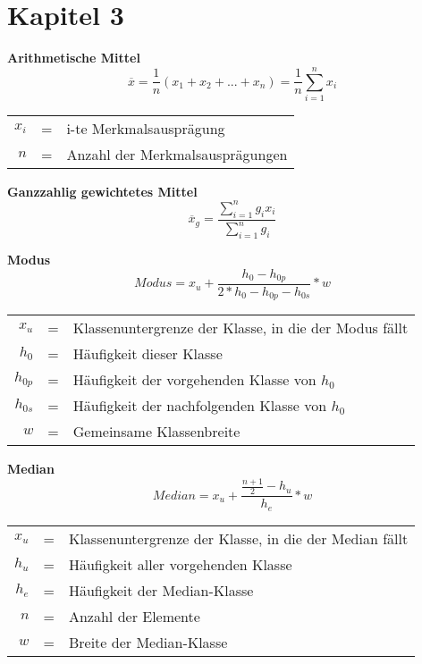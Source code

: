 \documentclass[11pt,twocolumn,fleqn]{article}
\begin{document}
\footnotesize

\section{Kapitel 3}

\textbf{Arithmetische Mittel}
\begin{equation*}
\overline{x} = \frac{1}{n}(x_1+x_2+...+x_n)=\frac{1}{n}\sum_{i=1}^{n}x_i
\end{equation*}
\begin{center}\begin{tabular}{rcl}
   $x_i$ & = & i-te Merkmalsausprägung  \\
   $n$ & = & Anzahl der Merkmalsausprägungen \\
\end{tabular}\end{center}


\textbf{Ganzzahlig gewichtetes Mittel}
\begin{equation*}
\overline{x}_g = \frac{\sum_{i=1}^{n}g_ix_i}{\sum^{n}_{i=1}g_i}
\end{equation*}

\textbf{Modus}
\begin{equation*}
Modus = x_u + \frac{h_0-h_{0p}}{2* h_0-h_{0p}-h_{0s}} * w
\end{equation*}
\begin{center}\begin{tabular}{rcl}
   $x_u$ & = & Klassenuntergrenze der Klasse, in die der Modus fällt  \\
   $h_0$ & = & Häufigkeit dieser Klasse \\
   $h_{0p}$ & = & Häufigkeit der vorgehenden Klasse von $h_0$  \\
   $h_{0s}$ & = & Häufigkeit der nachfolgenden Klasse von $h_0$ \\
   $w$   & = &  Gemeinsame Klassenbreite \\
\end{tabular}\end{center}


\textbf{Median}
\begin{equation*}
Median = x_u + \frac{ \frac{n+1}{2}-h_u }{h_e} *w
\end{equation*}
\begin{center}\begin{tabular}{rcl}
   $x_u$ & = & Klassenuntergrenze der Klasse, in die der Median fällt  \\
   $h_u$ & = & Häufigkeit aller vorgehenden Klasse \\
   $h_e$ & = & Häufigkeit der Median-Klasse \\
   $n$   & = & Anzahl der Elemente \\
   $w$   & = &  Breite der Median-Klasse \\
\end{tabular}\end{center}
\end{document}
